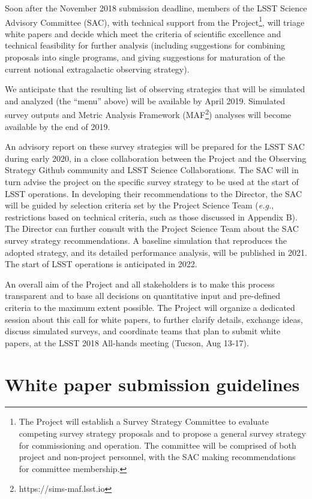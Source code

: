 \documentclass[DM,lsstdraft,toc,usenatbib]{lsstdoc}
\begin{document}
Soon after the November 2018 submission deadline, members of the LSST Science Advisory Committee (SAC), 
with technical support from the Project\footnote{The Project will establish a Survey 
Strategy Committee to evaluate competing survey strategy proposals and to propose a general survey 
strategy for commissioning and operation. The committee will be comprised of both project and 
non-project personnel, with the SAC making recommendations for committee membership.}, 
will triage white papers and decide which meet the criteria of scientific excellence and 
technical feasibility for further analysis (including suggestions for combining 
proposals into single programs, and giving suggestions for maturation of the current notional 
extragalactic observing strategy). 

We anticipate that the resulting list of observing strategies that will be simulated and analyzed 
(the ``menu'' above) will be available by April 2019. Simulated survey outputs and Metric Analysis 
Framework (MAF\footnote{https://sims-maf.lsst.io}) analyses will become available by the end 
of 2019. 

An advisory report on these survey strategies will be prepared for the LSST SAC during early 2020, 
in a close collaboration between the Project and the Observing Strategy Github community and 
LSST Science Collaborations. The SAC will in turn advise the project on the specific survey strategy 
to be used at the start of LSST operations. In developing their recommendations to the Director, the SAC will be guided by selection 
criteria set by the Project Science Team ({\it e.g.}, restrictions based on technical criteria,
such as those discussed in Appendix B). The Director can further consult with the Project Science 
Team about the SAC survey strategy recommendations. A baseline simulation that reproduces the
adopted strategy, and its detailed performance analysis, will be published in 2021. 
The start of LSST operations is anticipated in 2022.

An overall aim of the Project and all stakeholders is to make this process transparent and to base 
all decisions on quantitative input and pre-defined criteria to the maximum extent possible. 
The Project will organize a dedicated session about this call for white papers, to further clarify 
details, exchange ideas, discuss simulated surveys, and coordinate teams that plan to submit white papers,
at the LSST 2018 All-hands meeting (Tucson, Aug 13-17). 


\section{White paper submission guidelines} 
\end{document}
